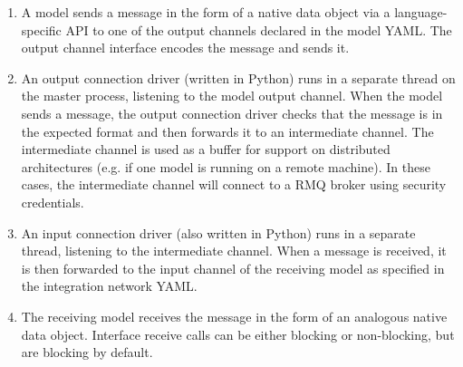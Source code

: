 \documentclass[journal]{IEEEtran}
\begin{document}
\begin{enumerate}
	\item A model sends a message in the form of a native data object via a language-specific API to one of the output channels declared in the model YAML. The output channel interface encodes the message and sends it.
	\item An output connection driver (written in Python) runs in a separate thread on the master process, listening to the model output channel. When the model sends a message, the output connection driver checks that the message is in the expected format and then forwards it to an intermediate channel. The intermediate channel is used as a buffer for support on distributed architectures (e.g. if one model is running on a remote machine). In these cases, the intermediate channel will connect to a RMQ broker using security credentials.
	\item An input connection driver (also written in Python) runs in a separate thread, listening to the intermediate channel. When a message is received, it is then forwarded to the input channel of the receiving model as specified in the integration network YAML.
	\item The receiving model receives the message in the form of an analogous native data object. Interface receive calls can be either blocking or non-blocking, but are blocking by default.
\end{enumerate}


\end{document}
